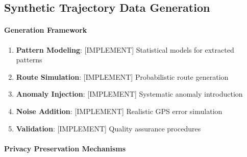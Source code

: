 \documentclass[runningheads]{llncs}
\begin{document}

\subsection{Synthetic Trajectory Data Generation}
\label{sec:synthetic}


\paragraph{Generation Framework}

\begin{enumerate}
\item \textbf{Pattern Modeling}: [IMPLEMENT] Statistical models for extracted patterns

\item \textbf{Route Simulation}: [IMPLEMENT] Probabilistic route generation

\item \textbf{Anomaly Injection}: [IMPLEMENT] Systematic anomaly introduction

\item \textbf{Noise Addition}: [IMPLEMENT] Realistic GPS error simulation

\item \textbf{Validation}: [IMPLEMENT] Quality assurance procedures
\end{enumerate}

\paragraph{Privacy Preservation Mechanisms}
\end{document}

